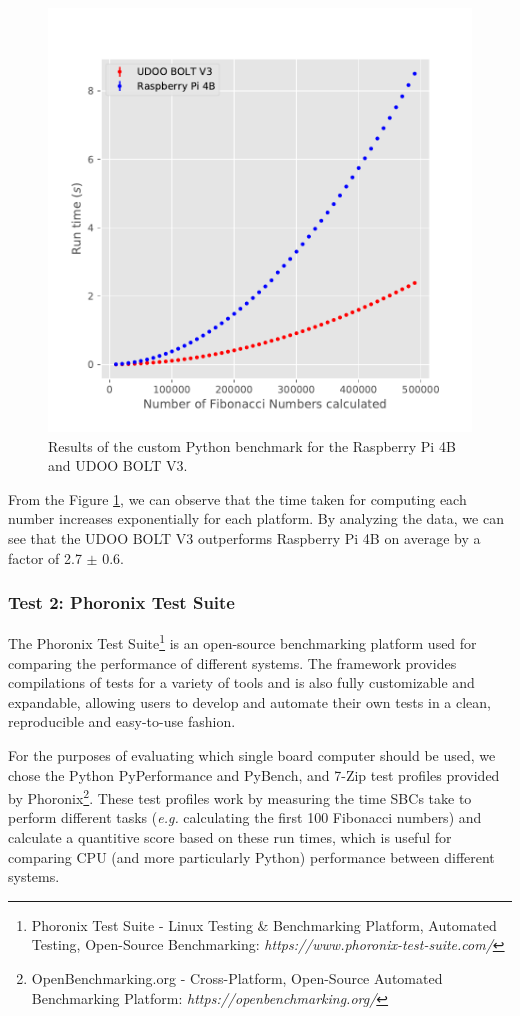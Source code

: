\begin{figure}[H]
    \centering
    \includegraphics[width=0.6 \linewidth]{images/fibonacci-test.pdf}
    \caption [Results of the custom Python benchmark for the Raspberry Pi 4B and UDOO BOLT V3.]{ Results of the custom Python benchmark for the Raspberry Pi 4B and UDOO BOLT V3. }
    \label{fig:fibonacci-tests}
\end{figure}

From the Figure \ref{fig:fibonacci-tests}, we can observe that the time taken for computing each number increases exponentially for each platform. By analyzing the data, we can see that the UDOO BOLT V3 outperforms Raspberry Pi 4B on average by a factor of 2.7 $\pm$ 0.6.

\subsubsection{Test 2: Phoronix Test Suite}

The Phoronix Test Suite\footnote{Phoronix Test Suite - Linux Testing \& Benchmarking Platform, Automated Testing, Open-Source Benchmarking: \textit{https://www.phoronix-test-suite.com/}} is an open-source benchmarking platform used for comparing the performance of different systems. The framework provides compilations of tests for a variety of tools and is also fully customizable and expandable, allowing users to develop and automate their own tests in a clean, reproducible and easy-to-use fashion.  

For the purposes of evaluating which single board computer should be used, we chose the Python PyPerformance and PyBench, and 7-Zip test profiles provided by Phoronix\footnote{OpenBenchmarking.org - Cross-Platform, Open-Source Automated Benchmarking Platform: \textit{https://openbenchmarking.org/}}. These test profiles work by measuring the time \acs{SBC}s take to perform different tasks (\textit{e.g.} calculating the first 100 Fibonacci numbers) and calculate a quantitive score based on these run times, which is useful for comparing CPU (and more particularly Python) performance between different systems.

